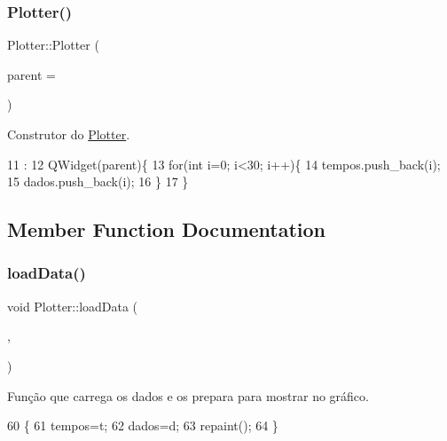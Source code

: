 \subsubsection{\texorpdfstring{Plotter()}{Plotter()}}
{\footnotesize\ttfamily Plotter\+::\+Plotter (\begin{DoxyParamCaption}\item[{Q\+Widget $\ast$}]{parent = {} }\end{DoxyParamCaption})\hspace{0.3cm}{\ttfamily [explicit]}}



Construtor do \mbox{\hyperlink{class_plotter}{Plotter}}. 


\begin{DoxyCode}
11                                 :
12     QWidget(parent)\{
13     \textcolor{keywordflow}{for}(\textcolor{keywordtype}{int} i=0; i<30; i++)\{
14         tempos.push\_back(i);
15         dados.push\_back(i);
16     \}
17 \}
\end{DoxyCode}


\subsection{Member Function Documentation}
\mbox{\label{class_plotter_ae73b5093b98bbbebd6abdb4e7e7807ed}} 
\subsubsection{\texorpdfstring{load\+Data()}{loadData()}}
{\footnotesize\ttfamily void Plotter\+::load\+Data (\begin{DoxyParamCaption}\item[{std\+::vector$<$ double $>$}]{,  }\item[{std\+::vector$<$ double $>$}]{ }\end{DoxyParamCaption})}



Função que carrega os dados e os prepara para mostrar no gráfico. 


\begin{DoxyCode}
60                                                         \{
61     tempos=t;
62     dados=d;
63     repaint();
64 \}
\end{DoxyCode}
\mbox{\label{class_plotter_ac4341569909943e37e1ff756587e6e12}} 
